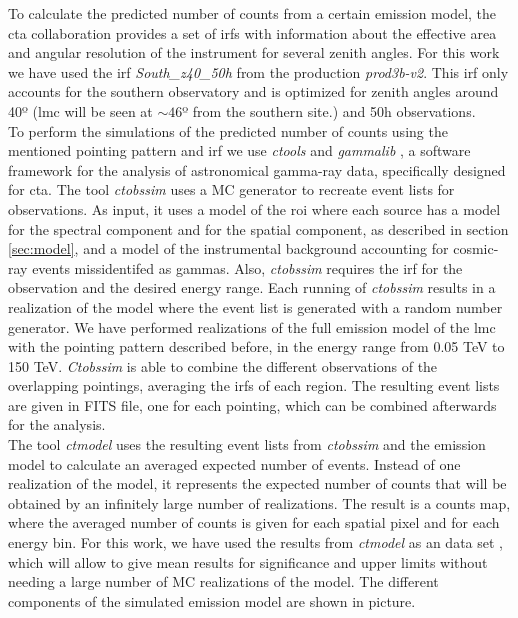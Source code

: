 \documentclass[main.tex]{subfiles}
\begin{document}
To calculate the predicted number of counts from a certain emission model, the \gls{cta} collaboration provides a set of \glspl{irf} \cite{CTAPerformance} with information about the effective area and angular resolution of the instrument for several zenith angles. For this work we have used the \gls{irf} \textit{South\_z40\_50h} from the production \textit{prod3b-v2}. This \gls{irf} only accounts for the southern observatory and is optimized for zenith angles around 40º (\gls{lmc} will be seen at $\sim 46$º from the southern site.) and 50h observations. \\
To perform the simulations of the predicted number of counts using the mentioned pointing pattern and \gls{irf} we use \textit{ctools} and \textit{gammalib} \cite{2016Actools}, a software framework for the analysis of astronomical gamma-ray data, specifically designed for \gls{cta}. The tool \textit{ctobssim} uses a MC generator to recreate event lists for observations. As input, it uses a model of the \gls{roi} where each source has a model for the spectral component and for the spatial component, as described in section \ref{sec:model}, and a model of the instrumental background accounting for cosmic-ray events missidentifed as gammas.
Also, \textit{ctobssim} requires the \gls{irf} for the observation and the desired energy range. Each running of \textit{ctobssim} results in a realization of the model where the event list is generated with a random number generator. We have performed realizations of the full emission model of the \gls{lmc} with the pointing pattern described before, in the energy range from 0.05 TeV to 150 TeV. \textit{Ctobssim} is able to combine the different observations of the overlapping pointings, averaging the \glspl{irf} of each region. The resulting event lists are given in FITS file, one for each pointing, which can be combined afterwards for the analysis.\\
The tool \textit{ctmodel} uses the resulting event lists from \textit{ctobssim} and the emission model to calculate an averaged expected number of events. Instead of one realization of the model, it represents the expected number of counts that will be obtained by an infinitely large number of realizations. The result is a counts map, where the averaged number of counts is given for each spatial pixel and for each energy bin. For this work, we have used the results from \textit{ctmodel} as an  data set \cite{2011Asimov}, which will allow to give mean results for significance and upper limits without needing a large number of MC realizations of the model.
The different components of the simulated emission model are shown in picture.
    
\end{document}
